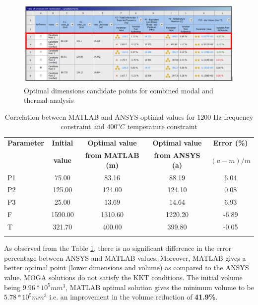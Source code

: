 \documentclass[12pt]{article}
\begin{document}
\begin{figure}[H]
\begin{center}
\includegraphics[width=1\textwidth]{mt.jpg}
\caption{Optimal dimensions candidate points for combined modal and thermal analysis}
\label{mt}
\end{center}
\end{figure}
\newpage
\begin{longtable}{|l|c|c|c|c|}
\hline 
\textbf{Parameter} & \textbf{Initial} & \textbf{Optimal value} & \textbf{Optimal value} & \textbf{Error (\%)} \\
 & \textbf{value} & \textbf{from MATLAB (m)} & \textbf{from ANSYS (a)} & \textbf{$(a-m)/m$}\\
\hline
P1 & 75.00 & 83.16 & 88.19 & 6.04 \\
\hline
P2 & 125.00 & 124.00 & 124.10 & 0.08 \\
\hline
P3 & 25.00 & 13.69 & 14.64 & 6.93\\
\hline
F & 1590.00 & 1310.60 & 1220.20 & -6.89 \\
\hline
T & 321.70 & 400.00 & 399.80 & -0.05 \\
\hline
\caption{Correlation between MATLAB and ANSYS optimal values for 1200 Hz frequency constraint and $400^{o}C$ temperature constraint}
\label{2con1}
\end{longtable}
As observed from the Table \ref{2con1}, there is no significant difference in the error percentage between ANSYS and MATLAB values. Moreover, MATLAB gives a better optimal point (lower dimensions and volume) as compared to the ANSYS value. MOGA solutions do not satisfy the KKT conditions. The initial volume being $9.96*10^{5} mm^{3}$, MATLAB optimal solution gives the minimum volume to be $5.78*10^{5} mm^{3}$ i.e. an improvement in the volume reduction of \textbf{41.9\%}.
\end{document}
